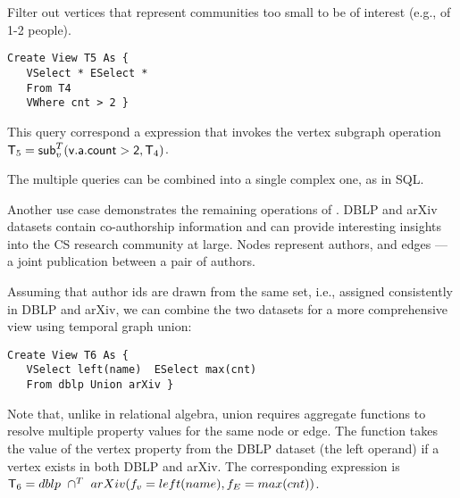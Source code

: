 
\begin{example}
\label{ex:subg}

Filter out vertices that represent communities too small to be of
interest (e.g., of 1-2 people).  

\begin{small} 
\begin{verbatim}
Create View T5 As {
   VSelect * ESelect *
   From T4
   VWhere cnt > 2 }
\end{verbatim}
\end{small}

This query correspond a \tra expression that invokes the vertex
subgraph operation $\mathsf{T}_5 = \textsf{sub}^T_v(\mathsf{v.a.count > 2},\mathsf{T}_4)$.

\end{example}

The multiple queries can be combined into a single complex one, as in
SQL.  

Another use case demonstrates the remaining operations of \tga.  DBLP
and arXiv datasets contain co-authorship information and can provide
interesting insights into the CS research community at large.  Nodes
represent authors, and edges --- a joint publication between a pair of
authors.

\begin{example}
\label{ex:union}

Assuming that author ids are drawn from the same set, i.e., assigned
consistently in DBLP and arXiv, we can combine the two datasets for a
more comprehensive view using temporal graph union:

\begin{small}
\begin{verbatim}
Create View T6 As {
   VSelect left(name)  ESelect max(cnt)
   From dblp Union arXiv }
\end{verbatim}
\end{small}

Note that, unlike in relational algebra, \tga union requires aggregate
functions to resolve multiple property values for the same node or
edge.  The  function takes the value of the vertex
property  from the DBLP dataset (the left operand) if a
vertex exists in both DBLP and arXiv. The corresponding \tga
expression is $\mathsf{T}_6 = dblp~\cap^T~arXiv(f_v=left(name),f_E=max(cnt))$.

\end{example}

